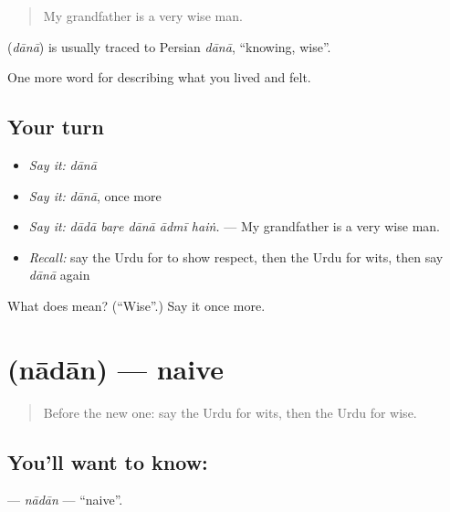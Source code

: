 \begin{quote}
My grandfather is a very wise man.
\end{quote}

\begin{cousinweb}
\textbf{} (\emph{dānā}) is usually traced to Persian \emph{dānā}, \textquotedblleft{}knowing, wise\textquotedblright{}.
\end{cousinweb}

\begin{grammarlens}[title={What you've built}]
One more word for describing what you lived and felt.
\end{grammarlens}

\subsection*{Your turn}
\begin{itemize}
\raggedright
  \item \emph{Say it:} \emph{dānā}
  \item \emph{Say it:} \emph{dānā}, once more
  \item \emph{Say it:} \emph{dādā baṛe dānā ādmī haiṅ.} — My grandfather is a very wise man.
  \item \emph{Recall:} say the Urdu for to show respect, then the Urdu for wits, then say \emph{dānā} again
\end{itemize}

\begin{tcolorbox}[breakable,colback=teal!4,colframe=teal!35!black,title={Before you move on}]
What does  mean? (\textquotedblleft{}Wise\textquotedblright{}.) Say it once more.
\end{tcolorbox}
\section[\texorpdfstring{\ur{نادان} (nādān)}{نادان (nādān)}]{ (nādān) — naive}

\label{lesson:UR-C462-nadan}



\begin{quote}
Before the new one: say the Urdu for wits, then the Urdu for wise.
\end{quote}

\subsection*{You'll want to know: }
\textbf{} — \emph{nādān} — \textquotedblleft{}naive\textquotedblright{}.

